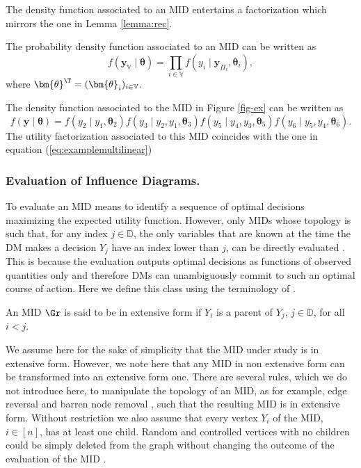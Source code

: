 The density function associated to an \gls{MID} entertains a factorization which mirrors the one in Lemma \ref{lemma:rec}.

\begin{lemma}
\label{lemma:id}
The probability density function associated to an \gls{MID} can be written as
\begin{equation*}
f(\bm{y}_{\mathbb{V}}\;|\;\bm{\theta})=\prod_{i\in{\mathbb{V}}}f(y_i\;|\;\bm{y}_{\Pi_i},\bm{\theta}_i),
\end{equation*}
where $\bm{\theta}^\T=(\bm{\theta}_i)_{i\in\mathbb{V}}$.
\end{lemma}

\begin{example}
The density function associated to the \gls{MID} in Figure \ref{fig-ex} can be written as
\begin{equation*}
f(\bm{y}\;|\;\bm{\theta})=f(y_2\;|\;y_1,\bm{\theta}_2)f(y_3\;|\;y_2,y_1,\bm{\theta}_3)f(y_5\;|\;y_4,y_3,\bm{\theta}_5)f(y_6\;|\;y_5,y_4,\bm{\theta}_6).
\end{equation*}
The utility factorization associated to this \gls{MID} coincides with the one in equation (\ref{eq:examplemultilinear})
\end{example}
\subsubsection{Evaluation of Influence Diagrams.} 
To evaluate an \gls{MID} means to identify a sequence of optimal decisions maximizing the expected utility function. However, only  \glspl{MID} whose topology is such that, for any index $j\in\mathbb{D}$, the only variables that are known at the time the \gls{DM} makes a decision $Y_j$  have an index lower than $j$, can be directly evaluated \citep{Smith1989a}. This is because the evaluation outputs optimal decisions as functions of observed quantities only and therefore \glspl{DM} can unambiguously commit to such an optimal course of action. Here we define this class using the terminology of \cite{Smith2010}.
\begin{definition}
\label{ei}
An \gls{MID} $\Gr$  is said to be in extensive form if $Y_i$ is a parent of $Y_j$, $j\in\mathbb{D}$, for all $i<j$. 
\end{definition}
We assume here for the sake of simplicity that the \gls{MID} under study is in extensive form. However, we note here that any \gls{MID} in non extensive form can be transformed into an extensive form one. There are several rules, which we do not introduce here, to manipulate the topology of an \gls{MID}, as for example, edge reversal and barren node removal \citep[see e.g.][]{Jensen2009}, such that the resulting \gls{MID} is in extensive form.  Without restriction we also assume that every vertex $Y_i$ of the \gls{MID}, $i\in [n]$, has at least one child. Random and controlled vertices with no children could be simply deleted from the graph without changing the outcome of the evaluation of the \gls{MID} \citep[see e.g.][]{Jensen2009}.  


